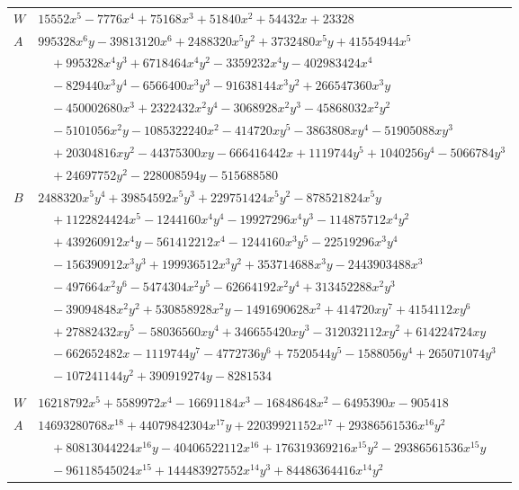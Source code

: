 \documentclass[11pt]{article}
\begin{document}
\begin{longtable}{@{}ll@{}}
$W$ & $15552x^{5}-7776x^{4}+75168x^{3}+51840x^{2}+54432x+23328$\\
$A$ & $995328x^{6}y-39813120x^{6}+2488320x^{5}y^{2}+3732480x^{5}y+41554944x^{5}$\\
 & $\quad +995328x^{4}y^{3}+6718464x^{4}y^{2}-3359232x^{4}y-402983424x^{4}$\\
 & $\quad -829440x^{3}y^{4}-6566400x^{3}y^{3}-91638144x^{3}y^{2}+266547360x^{3}y$\\
 & $\quad -450002680x^{3}+2322432x^{2}y^{4}-3068928x^{2}y^{3}-45868032x^{2}y^{2}$\\
 & $\quad -5101056x^{2}y-1085322240x^{2}-414720xy^{5}-3863808xy^{4}-51905088xy^{3}$\\
 & $\quad +20304816xy^{2}-44375300xy-666416442x+1119744y^{5}+1040256y^{4}-5066784y^{3}$\\
 & $\quad +24697752y^{2}-228008594y-515688580$\\
$B$ & $2488320x^{5}y^{4}+39854592x^{5}y^{3}+229751424x^{5}y^{2}-878521824x^{5}y$\\
 & $\quad +1122824424x^{5}-1244160x^{4}y^{4}-19927296x^{4}y^{3}-114875712x^{4}y^{2}$\\
 & $\quad +439260912x^{4}y-561412212x^{4}-1244160x^{3}y^{5}-22519296x^{3}y^{4}$\\
 & $\quad -156390912x^{3}y^{3}+199936512x^{3}y^{2}+353714688x^{3}y-2443903488x^{3}$\\
 & $\quad -497664x^{2}y^{6}-5474304x^{2}y^{5}-62664192x^{2}y^{4}+313452288x^{2}y^{3}$\\
 & $\quad -39094848x^{2}y^{2}+530858928x^{2}y-1491690628x^{2}+414720xy^{7}+4154112xy^{6}$\\
 & $\quad +27882432xy^{5}-58036560xy^{4}+346655420xy^{3}-312032112xy^{2}+614224724xy$\\
 & $\quad -662652482x-1119744y^{7}-4772736y^{6}+7520544y^{5}-1588056y^{4}+265071074y^{3}$\\
 & $\quad -107241144y^{2}+390919274y-8281534$\\
\addlinespace[3pt]
\multicolumn{2}{@{}l}{$i=75$, $m=13122$, neighbours $116,7,15,26,38,42,53,59,71,72,78,85,104$}\\
$W$ & $16218792x^{5}+5589972x^{4}-16691184x^{3}-16848648x^{2}-6495390x-905418$\\
$A$ & $14693280768x^{18}+44079842304x^{17}y+22039921152x^{17}+29386561536x^{16}y^{2}$\\
 & $\quad +80813044224x^{16}y-40406522112x^{16}+176319369216x^{15}y^{2}-29386561536x^{15}y$\\
 & $\quad -96118545024x^{15}+144483927552x^{14}y^{3}+84486364416x^{14}y^{2}$\\

\end{longtable}
\end{document}
